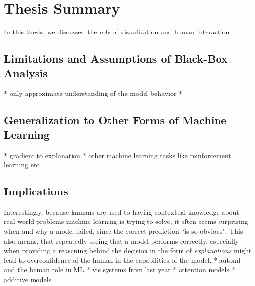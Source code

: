 \chapter{Thesis Summary}
\label{chap:summary}

In this thesis, we discussed the role of visualization and human interaction 

\section{Limitations and Assumptions of Black-Box Analysis}
* only approximate understanding of the model behavior
* 

\section{Generalization to Other Forms of Machine Learning}
* gradient to explanation
* other machine learning tasks like reinforcement learning etc.

\section{Implications}

Interestingly, because humans are used to having contextual knowledge about real world problems machine learning is trying to solve, it often seems surprising when and why a model failed, since the correct prediction ``is so obvious".
This also means, that repeatedly seeing that a model performs correctly, especially when providing a reasoning behind the decision in the form of \emph{explanations} might lead to overconfidence of the human in the capabilities of the model.
* automl and the human role in ML
* vis systems from last year
* attention models
* additive models




% 
% 

